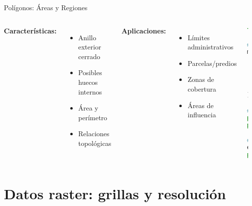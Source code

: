\documentclass[10pt]{beamer}
\begin{document}
\begin{frame}[fragile]{Polígonos: Áreas y Regiones}
    \begin{columns}
        \textbf{Características:}
        \begin{itemize}
            \item Anillo exterior cerrado
            \item Posibles huecos internos
            \item Área y perímetro
            \item Relaciones topológicas
        \end{itemize}
        
        \textbf{Aplicaciones:}
        \begin{itemize}
            \item Límites administrativos
            \item Parcelas/predios
            \item Zonas de cobertura
            \item Áreas de influencia
        \end{itemize}
        
        \begin{lstlisting}[language=Python, caption=Polígonos y análisis]
from shapely.geometry import Polygon

# Crear polígono
manzana = Polygon([
    (-70.650, -33.440),
    (-70.648, -33.440),
    (-70.648, -33.438),
    (-70.650, -33.438),
    (-70.650, -33.440)
])

# Propiedades geométricas
print(f"Area: {manzana.area}")
print(f"Perimetro: {manzana.length}")

# Operaciones espaciales
edificio = Point(-70.649, -33.439)
print(manzana.contains(edificio))
        \end{lstlisting}
    \end{columns}
\end{frame}

\section{Datos raster: grillas y resolución}
\end{document}
